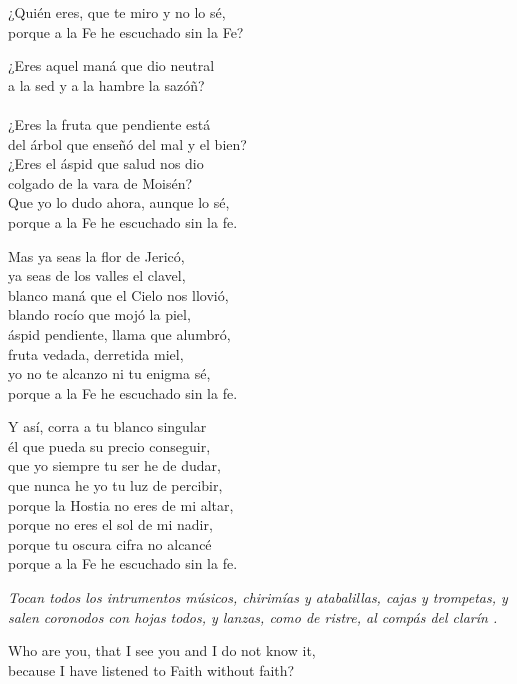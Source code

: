 
\begin{poemtranslation}
\begin{original}
¿Quién eres, que te miro y no lo sé,\\
porque a la Fe he escuchado sin la Fe? 

¿Eres aquel maná que dio neutral\\ 
a la sed y a la hambre la sazóñ?\\
\Dots{}\\
¿Eres la fruta que pendiente está\\ 
del árbol que enseñó del mal y el bien?\\
¿Eres el áspid que salud nos dio\\
colgado de la vara de Moisén?\\
Que yo lo dudo ahora, aunque lo sé,\\
porque a la Fe he escuchado sin la fe. 

Mas ya seas la flor de Jericó,\\
ya seas de los valles el clavel,\\
blanco maná que el Cielo nos llovió,\\
blando rocío que mojó la piel,\\
áspid pendiente, llama que alumbró,\\
fruta vedada, derretida miel,\\
yo no te alcanzo ni tu enigma sé,\\
porque a la Fe he escuchado sin la fe. 

Y así, corra a tu blanco singular\\ 
él que pueda su precio conseguir,\\
que yo siempre tu ser he de dudar,\\
que nunca he yo tu luz de percibir,\\
porque la Hostia no eres de mi altar,\\
porque no eres el sol de mi nadir,\\
porque tu oscura cifra no alcancé\\
porque a la Fe he escuchado sin la fe. 

\emph{Tocan todos los intrumentos músicos, chirimías y atabalillas, cajas y trompetas,
y salen coronodos con hojas todos, y lanzas, como de ristre, al compás del clarín \Dots.} 
\end{original}

\begin{translation}
Who are you, that I see you and I do not know it,\\
because I have listened to Faith without faith? 


\end{translation}
\end{poemtranslation}
